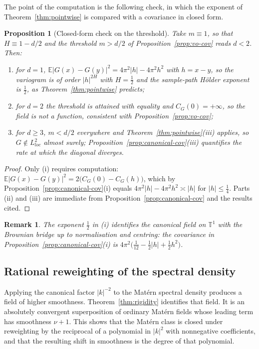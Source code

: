 \documentclass[pdflatex,sn-mathphys,Numbered]{sn-jnl}
\theoremstyle{thmstyleone}%
\newtheorem{proposition}[theorem]{Proposition}%
\theoremstyle{thmstyletwo}%
\newtheorem{remark}[theorem]{Remark}%
\theoremstyle{thmstylethree}%
\newcommand{\TT}{\mathbb{T}}
\newcommand{\E}{\mathbb{E}}
\begin{document}
The point of the computation is the following check, in which the exponent of
Theorem~\ref{thm:pointwise} is compared with a covariance in closed form.

\begin{proposition}[Closed-form check on the threshold]\label{prop:check}
Take $m \equiv 1$, so that $H \equiv 1 - d/2$ and the threshold $m > d/2$ of
Proposition~\ref{prop:vo-cov} reads $d < 2$. Then:
\begin{enumerate}
\item[(i)] for $d = 1$, $\E|G(x)-G(y)|^2 = 4\pi^2|h| - 4\pi^2h^2$ with $h = x-y$,
    so the variogram is of order $|h|^{2H}$ with $H = \tfrac12$ and the
    sample-path H\"older exponent is $\tfrac12$, as
    Theorem~\ref{thm:pointwise} predicts;
\item[(ii)] for $d = 2$ the threshold is attained with equality and
    $C_G(0) = +\infty$, so the field is not a function, consistent with
    Proposition~\ref{prop:vo-cov};
\item[(iii)] for $d \geq 3$, $m < d/2$ everywhere and
    Theorem~\ref{thm:pointwise}(iii) applies, so $G \notin L^2_{loc}$ almost
    surely; Proposition~\ref{prop:canonical-cov}(iii) quantifies the rate at
    which the diagonal diverges.
\end{enumerate}
\end{proposition}

\begin{proof}
Only (i) requires computation: $\E|G(x)-G(y)|^2 = 2\bigl(C_G(0)-C_G(h)\bigr)$,
which by Proposition~\ref{prop:canonical-cov}(i) equals
$4\pi^2|h| - 4\pi^2h^2 \asymp |h|$ for $|h| \leq \tfrac14$. Parts (ii) and (iii)
are immediate from Proposition~\ref{prop:canonical-cov} and the results cited.
\end{proof}

\begin{remark}
The exponent $\tfrac12$ in (i) identifies the canonical field on $\TT^1$ with the
Brownian bridge up to normalisation and centring: the covariance in
Proposition~\ref{prop:canonical-cov}(i) is
$4\pi^2\bigl(\tfrac1{12} - \tfrac12|h| + \tfrac12h^2\bigr)$.
\end{remark}

\subsection{Rational reweighting of the spectral density}
\label{subsec:reweighting}

Applying the canonical factor $|k|^{-2}$ to the Mat\'ern spectral density
produces a field of higher smoothness. Theorem~\ref{thm:rigidity} identifies
that field. It is an absolutely convergent superposition of
ordinary Mat\'ern fields whose leading term has smoothness $\nu+1$. This
shows that the
Mat\'ern class is closed under reweighting by the reciprocal of a polynomial in
$|k|^2$ with nonnegative coefficients, and that the resulting shift in
smoothness is the degree of that polynomial.
\end{document}
